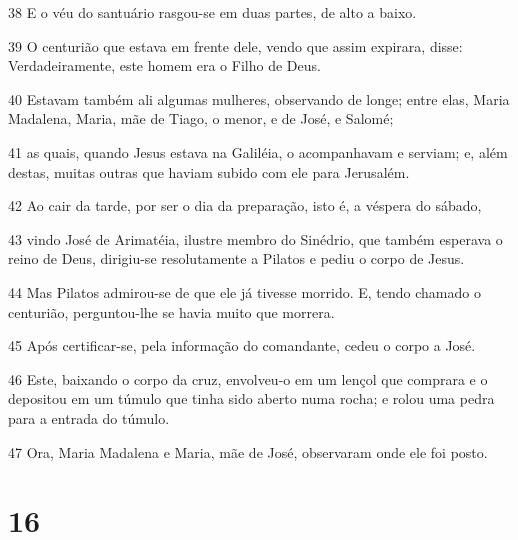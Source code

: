 \par 38 E o véu do santuário rasgou-se em duas partes, de alto a baixo.
\par 39 O centurião que estava em frente dele, vendo que assim expirara, disse: Verdadeiramente, este homem era o Filho de Deus.
\par 40 Estavam também ali algumas mulheres, observando de longe; entre elas, Maria Madalena, Maria, mãe de Tiago, o menor, e de José, e Salomé;
\par 41 as quais, quando Jesus estava na Galiléia, o acompanhavam e serviam; e, além destas, muitas outras que haviam subido com ele para Jerusalém.
\par 42 Ao cair da tarde, por ser o dia da preparação, isto é, a véspera do sábado,
\par 43 vindo José de Arimatéia, ilustre membro do Sinédrio, que também esperava o reino de Deus, dirigiu-se resolutamente a Pilatos e pediu o corpo de Jesus.
\par 44 Mas Pilatos admirou-se de que ele já tivesse morrido. E, tendo chamado o centurião, perguntou-lhe se havia muito que morrera.
\par 45 Após certificar-se, pela informação do comandante, cedeu o corpo a José.
\par 46 Este, baixando o corpo da cruz, envolveu-o em um lençol que comprara e o depositou em um túmulo que tinha sido aberto numa rocha; e rolou uma pedra para a entrada do túmulo.
\par 47 Ora, Maria Madalena e Maria, mãe de José, observaram onde ele foi posto.

\chapter{16}

